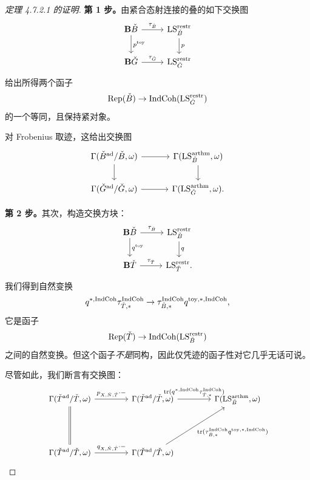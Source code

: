 \begin{proof}[定理 4.7.2.1 的证明]
\textbf{第 1 步。}由紧合态射连接的叠的如下交换图
\[
\begin{tikzcd}[column sep=2.6em, row sep=1.8em]
  \mathbf{B}\bB \arrow[r, "\tau_{\bB}"] \arrow[d, "p^{\mathrm{toy}}"]
    & \LS^{\restr}_{\bB} \arrow[d, "p"]\\
  \mathbf{B}\bG \arrow[r, "\tau_{\bG}"]
    & \LS^{\restr}_{\bG}
\end{tikzcd}
\]
给出所得两个函子
\[
  \mathrm{Rep}(\check{B})\to\mathrm{IndCoh}(\mathrm{LS}^{\mathrm{restr}}_{\check{G}})
\]
的一个等同，且保持紧对象。

对 Frobenius 取迹，这给出交换图
\begin{equation}
\begin{tikzcd}[column sep=3.2em, row sep=1.8em]
  \Gamma(\bB^{\ad}/\bB,\omega) \arrow[r] \arrow[d]
    & \Gamma(\LS^{\arthm}_{\bB},\omega) \arrow[d]\\
  \Gamma(\bG^{\ad}/\bG,\omega) \arrow[r]
    & \Gamma(\LS^{\arthm}_{\bG},\omega).
\end{tikzcd}
\end{equation}

\textbf{第 2 步。}其次，构造交换方块：
\[
\begin{tikzcd}[column sep=2.6em, row sep=1.8em]
  \mathbf{B}\bB \arrow[r, "\tau_{\bB}"] \arrow[d, "q^{\mathrm{toy}}"]
    & \LS^{\restr}_{\bB} \arrow[d, "q"]\\
  \mathbf{B}\bT \arrow[r, "\tau_{\bT}"]
    & \LS^{\restr}_{\bT}.
\end{tikzcd}
\]
我们得到自然变换
\[
  q^{*,\mathrm{IndCoh}}\tau_{\check{T},*}^{\mathrm{IndCoh}}
  \to \tau_{\check{B},*}^{\mathrm{IndCoh}}q^{\mathrm{toy},*,\mathrm{IndCoh}},
\]
它是函子
\[
  \mathrm{Rep}(\check{T})\to\mathrm{IndCoh}(\mathrm{LS}^{\mathrm{restr}}_{\check{B}})
\]
之间的自然变换。但这个函子\emph{不是}同构，因此仅凭迹的函子性对它几乎无话可说。

尽管如此，我们断言有交换图：
\begin{equation}
\begin{tikzcd}[column sep=3.95em, row sep=4.4em, cells={font=\small}]
  \Gamma(\bT^{\ad}/\bT,\omega) \arrow[r, "p_{X,\bN,\bT}\cdot-"] \arrow[d, equal]
    & \Gamma(\bT^{\ad}/\bT,\omega) \arrow[r, "\tr(q^{*,\IndCoh}\tau_{\bT,*}^{\IndCoh})"]
    & \Gamma(\LS^{\arthm}_{\bB},\omega)\\
  \Gamma(\bT^{\ad}/\bT,\omega) \arrow[r, "q_{X,\bN,\bT}\cdot-"]
    & \Gamma(\bT^{\ad}/\bT,\omega) \arrow[ur, "\tr(\tau_{\bB,*}^{\IndCoh}q^{\mathrm{toy},*,\IndCoh})"']
    & 
\end{tikzcd}
\end{equation}


\end{proof}
